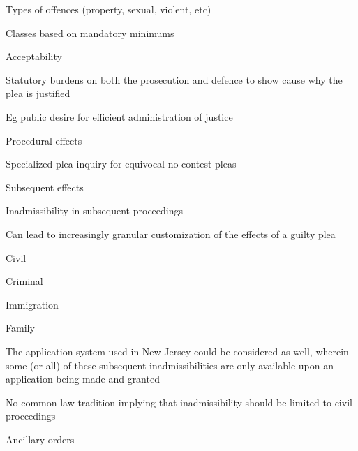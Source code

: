 Types of offences (property, sexual, violent, etc)

Classes based on mandatory minimums

Acceptability

Statutory burdens on both the prosecution and defence to show cause why the plea is justified

Eg public desire for efficient administration of justice

Procedural effects

Specialized plea inquiry for equivocal no-contest pleas

Subsequent effects

Inadmissibility in subsequent proceedings

Can lead to increasingly granular customization of the effects of a guilty plea

Civil

Criminal

Immigration

Family

The application system used in New Jersey could be considered as well, wherein some (or all) of these subsequent inadmissibilities are only available upon an application being made and granted

No common law tradition implying that inadmissibility should be limited to civil proceedings

Ancillary orders